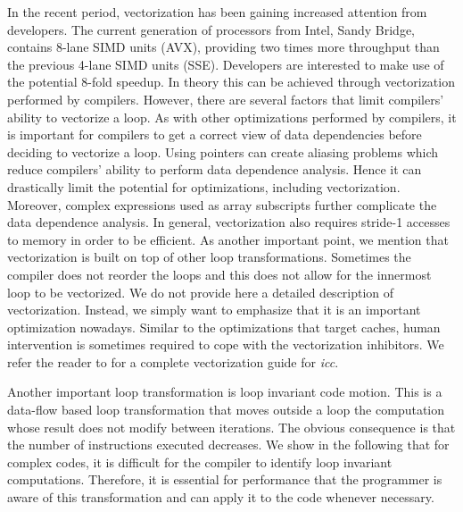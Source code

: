 In the recent period, vectorization has been gaining increased attention from
developers. The current generation of processors from Intel, Sandy Bridge,
contains 8-lane SIMD units (AVX), providing two times more throughput than the
previous 4-lane SIMD units (SSE). Developers are interested to make use of the
potential 8-fold speedup. In theory this can be achieved through vectorization
performed by compilers. However, there are several factors that limit compilers'
ability to vectorize a loop. As with other optimizations performed by compilers,
it is important for compilers to get a correct view of data dependencies before
deciding to vectorize a loop. Using pointers can create aliasing problems which
reduce compilers' ability to perform data dependence analysis. Hence it can
drastically limit the potential for optimizations, including vectorization.
Moreover, complex expressions used as array subscripts further complicate the
data dependence analysis. In general, vectorization also requires stride-1
accesses to memory in order to be efficient. As another important point, we
mention that vectorization is built on top of other loop transformations.
Sometimes the compiler does not reorder the loops and this does not allow for
the innermost loop to be vectorized.
We do not provide here a detailed description of vectorization. Instead, we
simply want to emphasize that it is an important optimization nowadays. Similar
to the optimizations that target caches, human intervention is sometimes
required to cope with the vectorization inhibitors. We refer the reader to
\cite{vec_guide} for a complete vectorization guide for \textit{icc}.

Another important loop transformation is loop invariant code motion. This is a
data-flow based loop transformation that moves outside a loop the computation
whose result does not modify between iterations.
The obvious consequence is that the number of instructions executed decreases. 
We show in the following that for complex codes, it is difficult for the
compiler to identify loop invariant computations. Therefore, it is essential for
performance that the programmer is aware of this transformation and can apply it
to the code whenever necessary.

